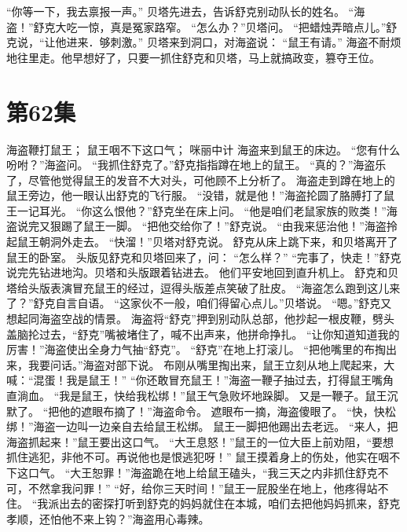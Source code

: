 \documentclass[a4paper,12pt,UTF8,twoside]{ctexbook}
\begin{document}
        “你等一下，我去禀报一声。” 
        贝塔先进去，告诉舒克别动队长的姓名。 
        “海盗！”舒克大吃一惊，真是冤家路窄。 
        “怎么办？”贝塔问。 
        “把蜡烛弄暗点儿。”舒克说，“让他进来．够刺激。” 
        贝塔来到洞口，对海盗说： 
        “鼠王有请。” 
        海盗不耐烦地往里走。他早想好了，只要一抓住舒克和贝塔，马上就搞政变，篡夺王位。   \chapter{第62集} 
        海盗鞭打鼠王； 
        鼠王咽不下这口气； 
        咪丽中计   
        海盗来到鼠王的床边。 
        “您有什么吩咐？”海盗问。 
        “我抓住舒克了。”舒克指指蹲在地上的鼠王。 
        “真的？”海盗乐了，尽管他觉得鼠王的发音不大对头，可他顾不上分析了。 
        海盗走到蹲在地上的鼠王旁边，他一眼认出舒克的飞行服。 
        “没错，就是他！”海盗抡圆了胳膊打了鼠王一记耳光。 
        “你这么恨他？”舒克坐在床上问。 
        “他是咱们老鼠家族的败类！”海盗说完又狠踢了鼠王一脚。 
        “把他交给你了！”舒克说。 
        “由我来惩治他！”海盗拎起鼠王朝洞外走去。 
        “快溜！”贝塔对舒克说。 
        舒克从床上跳下来，和贝塔离开了鼠王的卧室。 
        头版见舒克和贝塔回来了，问： 
        “怎么样？” 
        “完事了，快走！”舒克说完先钻进地沟。贝塔和头版跟着钻进去。 
        他们平安地回到直升机上。 
        舒克和贝塔给头版表演冒充鼠王的经过，逗得头版差点笑破了肚皮。 
        “海盗怎么跑到这儿来了？”舒克自言自语。 
        “这家伙不一般，咱们得留心点儿。”贝塔说。 
        “嗯。”舒克又想起同海盗空战的情景。 
        海盗将“舒克”押到别动队总部，他抄起一根皮鞭，劈头盖脑抡过去，“舒克”嘴被堵住了，喊不出声来，他拼命挣扎。 
        “让你知道知道我的厉害！”海盗使出全身力气抽“舒克”。 
      “舒克”在地上打滚儿。 
      “把他嘴里的布掏出来，我要问话。”海盗对部下说。 
        布刚从嘴里掏出来，鼠王立刻从地上爬起来，大喊：“混蛋！我是鼠王！” 
        “你还敢冒充鼠王！”海盗一鞭子抽过去，打得鼠王嘴角直淌血。 
        “我是鼠王，快给我松绑！”鼠王气急败坏地跺脚。 
        又是一鞭子。鼠王沉默了。 
        “把他的遮眼布摘了！”海盗命令。 
        遮眼布一摘，海盗傻眼了。 
        “快，快松绑！”海盗一边叫一边亲自去给鼠王松绑。 
        鼠王一脚把他踢出去老远。 
        “来人，把海盗抓起来！”鼠王要出这口气。 
        “大王息怒！”鼠王的一位大臣上前劝阻，“要想抓住逃犯，非他不可。再说他也是恨逃犯呀！” 
        鼠王摸着身上的伤处，他实在咽不下这口气。 
        “大王恕罪！”海盗跪在地上给鼠王磕头，“我三天之内非抓住舒克不可，不然拿我问罪！” 
        “好，给你三天时间！”鼠王一屁股坐在地上，他疼得站不住。 
        “我派出去的密探打听到舒克的妈妈就住在本城，咱们去把他妈妈抓来，舒克孝顺，还怕他不来上钩？”海盗用心毒辣。 
\end{document}
